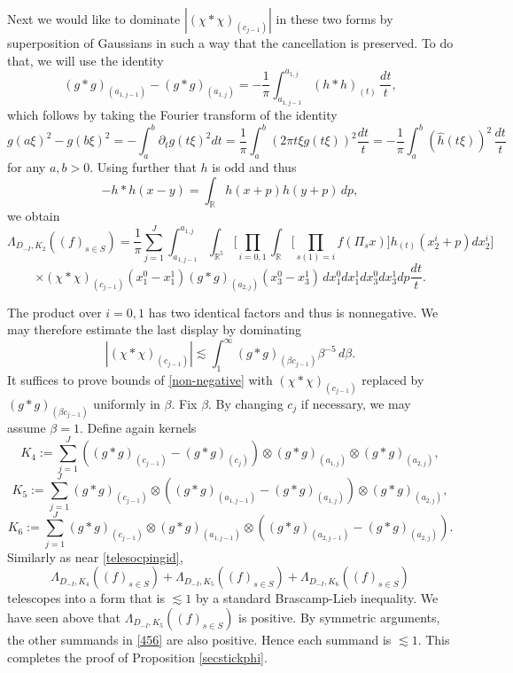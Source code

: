 \documentclass[12pt,reqno]{amsart}
\theoremstyle{plain}
\theoremstyle{definition}
\numberwithin{equation}{section}
\newcommand{\R}{{\mathbb R}}
\begin{document}
Next we would like to dominate
  $|(\chi*\chi)_{(c_{j-1})}|$ in these two forms by superposition of  Gaussians in such a way that the cancellation is preserved. To do that,  we will use the identity 
\begin{equation}\label{cor:gaus}
  (g*g)_{(a_{1,j-1})}   - (g*g)_{(a_{1,j})} =
  -\frac 1\pi \int_{a_{1,j-1}}^{a_{1,j}} (h*h)_{(t)}\,
\frac{dt}{t},   
\end{equation}
which follows by taking the Fourier transform of the identity
\[g(a\xi)^2   - g(b\xi)^2
=-\int_a^b  \partial_t g(t\xi)^2 dt=\frac 1\pi \int_a^b (2\pi t\xi  g(t\xi))^2 \frac{dt}t =-\frac 1\pi \int_a^b (\widehat{h}(t\xi))^2 \,\frac{dt}t
\]
for any $a,b>0$.
Using further that $h$ is odd and thus
\[- h*h(x-y)  =  \int_{\R} h(x+p)h(y+p)\,dp , \]
we obtain 
\[\Lambda_{D_{-I}, K_{2}}((f)_{s\in S}) = \frac 1\pi  \sum_{j=1}^J  \int_{a_{1,j-1}}^{a_{1,j}} \int_{\R^5}  \Big[\prod_{i=0,1} \int_{\R} \Big[ \prod_{s(1)=i} f (\Pi_sx) \Big] h_{(t)}(x_2^i+p) dx_2^i\Big]     \]
\begin{equation}
    \label{non-negative}
   \times   (\chi*\chi)_{(c_{j-1})}(x_1^0-x_1^1) (g*g)_{(a_{2,j})}(x_3^0-x_3^1)  \, dx_1^0dx_1^1dx_3^0dx_3^1dp \frac{dt}{t}.
\end{equation}
 
The product over $i=0,1$ has two identical factors and thus is nonnegative.
We may therefore estimate the last display by dominating 
\[|(\chi*\chi)_{(c_{j-1})}|\lesssim \int_1^\infty (g*g)_{(\beta c_{j-1})}\beta^{-5}\, d\beta .\]
It suffices to prove bounds of \eqref{non-negative}
with $(\chi*\chi)_{(c_{j-1})}$ replaced by $(g*g)_{(\beta c_{j-1})}$
uniformly in $\beta$. Fix $\beta$. By changing $c_j$ if necessary,
we may assume $\beta=1$.
Define again kernels
\begin{equation*}
     K_{4}  :=  %
        \sum_{j=1}^J ((g * g)_{( c_{j-1})} - (g * g)_{( c_{j})})\otimes (g* g)_{( a_{1,j})}\otimes  (g * g)_{( a_{2,j})}, 
\end{equation*} 
\[K_{5}:=\sum_{j=1}^J  (g * g)_{( c_{j-1})}\otimes ((g* g)_{( a_{1,j-1})} - (g* g)_{( a_{1,j})})\otimes (g * g)_{( a_{2,j})},\]
\[K_{6} := \sum_{j=1}^J  (g * g)_{( c_{j-1})}\otimes (g* g)_{( a_{1,j-1})} \otimes ((g  * g)_{( a_{2,j-1})} - (g * g)_{( a_{2,j})}).\]
Similarly as near \eqref{telesocpingid},
\begin{equation}\label{456}\Lambda_{D_{-I}, K_{4}}((f)_{s\in S})+\Lambda_{D_{-I}, K_{5}}((f)_{s\in S})+\Lambda_{D_{-I}, K_{6}}((f)_{s\in S})
\end{equation}
telescopes into a form that is $\lesssim 1$ by a standard Brascamp-Lieb inequality.
We have seen above that $\Lambda_{D_{-I}, K_{5}}((f)_{s\in S})$ is positive.
By symmetric arguments, the other summands in \eqref{456} are also positive.
Hence each summand is $\lesssim 1$.
This completes the proof of Proposition \ref{secstickphi}.
\end{document}
